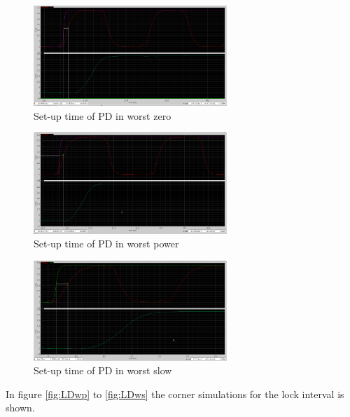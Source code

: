 \documentclass[a4paper,12pt]{article} \usepackage{graphicx}
\begin{document}
\begin{figure}[h]
  \centering
  \includegraphics[width=0.65\textwidth]{../Bilder/Layout/simulations/pd_wz.png}
  \caption{Set-up time of PD in worst zero}
  \label{fig:PDwz}
\end{figure}

\begin{figure}[h]
  \centering
  \includegraphics[width=0.65\textwidth]{../Bilder/Layout/simulations/pd_wp.png}
  \caption{Set-up time of PD in worst power}
  \label{fig:PDwp}
\end{figure}

\begin{figure}[h]
  \centering
  \includegraphics[width=0.65\textwidth]{../Bilder/Layout/simulations/pd_ws.png}
  \caption{Set-up time of PD in worst slow}
  \label{fig:PDws}
\end{figure}


In figure \ref{fig:LDwp} to \ref{fig:LDws} the corner simulations for
the lock interval is shown.
\end{document}

